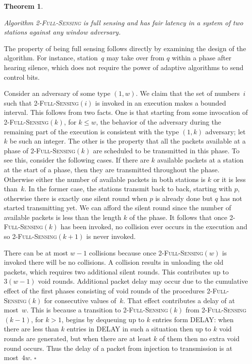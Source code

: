 \documentclass[11pt]{article}
\newcommand{\qed}{\hfill $\square$ \smallbreak}
\newenvironment{proof}{\noindent{\bf Proof:}}{\qed}
\newtheorem{theorem}{Theorem}
\begin{document}

\begin{theorem}
\label{thm:2-full-sensing-bounded-latency}

Algorithm \textsc{2-Full-Sensing} is full sensing and has fair latency in a system of two stations against any window adversary.
\end{theorem}


\begin{proof}
The property of being full sensing follows directly by examining the design of the algorithm.
For instance, station~$q$ may take over from $q$ within a phase after hearing silence,
which does not require the power of adaptive algorithms to send control bits.

Consider an adversary of some type  $(1,w)$.
We claim that the set of numbers~$i$ such that \textsc{2-Full-Sensing$(i)$} is invoked in an execution makes a bounded interval.
This follows from two facts.
One is that starting from some invocation of \textsc{2-Full-Sensing$(k)$}, for $k\le w$, the behavior of the adversary during the remaining part of the execution is consistent with the type $(1,k)$ adversary; let $k$ be such an integer.
The other is the property that all the packets available at a phase of \textsc{2-Full-Sensing$(k)$} are scheduled to be transmitted in this phase.
To see this, consider the following cases.
If there are $k$ available packets at a station at the start of a phase, then they are transmitted throughout the phase.
Otherwise either the number of available packets in both stations is $k$ or it is less than~$k$.
In the former case, the stations transmit back to back, starting with $p$, otherwise there is exactly one silent round when $p$ is already done but $q$ has not started transmitting yet.
We can afford the silent round since the number of available packets is less than the length $k$ of the phase.
It follows that once \textsc{2-Full-Sensing$(k)$} has been invoked, no collision ever occurs in the execution and so \textsc{2-Full-Sensing$(k+1)$} is never invoked.

There can be at most $w-1$ collisions because once \textsc{2-Full-Sensing$(w)$} is invoked there will be no collisions.
A collision results in unloading the old packets, which requires two additional silent rounds.
This contributes up to $3(w-1)$ void rounds.
Additional packet delay may occur due to the cumulative effect of the first phases consisting of void rounds of the procedures \textsc{2-Full-Sensing$(k)$} for consecutive values of~$k$.
That effect contributes a delay of at most~$w$.
This is because a transition to \textsc{2-Full-Sensing$(k)$} from \textsc{2-Full-Sensing$(k-1)$}, for $k>1$, begins by dequeuing up to $k$ entries form DELAY: when there are less than $k$ entries in DELAY in such a situation then up to $k$ void rounds are generated, but when there are at least $k$ of them then no extra void round occurs.
Thus the delay of a packet from injection to transmission is at most~$4w$.
\end{proof}
\end{document}
